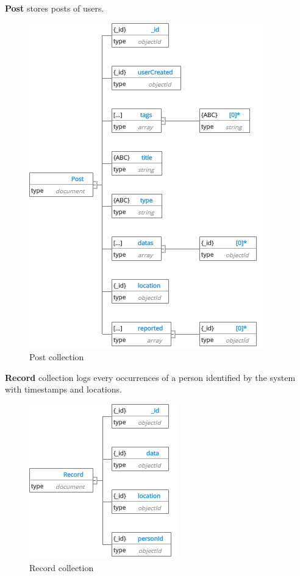 \textbf{Post} stores posts of users.
\begin{center}
	\begin{figure}[H]
		\centering
		\includegraphics[width=0.7\columnwidth]{images/chap4/Post.png}
		\caption{Post collection}
	\end{figure}
\end{center}
\cleardoublepage

\textbf{Record} collection logs every occurrences of a person identified by the system with timestamps and locations.
\begin{center}
	\begin{figure}[H]
		\centering
		\includegraphics[width=0.7\columnwidth]{images/chap4/Record.png}
		\caption{Record collection}
	\end{figure}
\end{center}
\cleardoublepage

